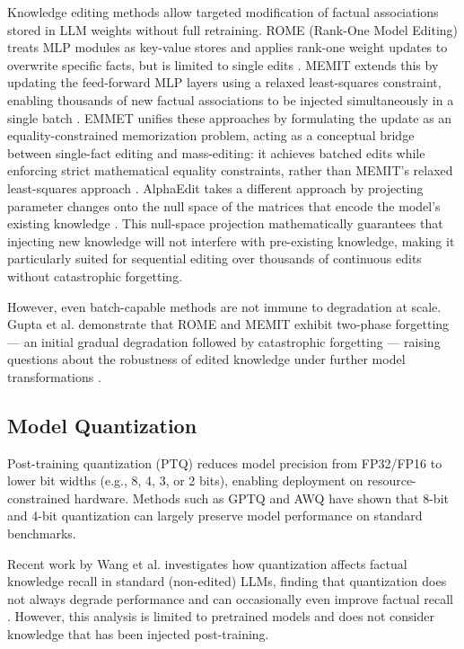 \documentclass[conference]{IEEEtran}
\begin{document}
Knowledge editing methods allow targeted modification of factual associations stored in LLM weights without full retraining. ROME (Rank-One Model Editing) treats MLP modules as key-value stores and applies rank-one weight updates to overwrite specific facts, but is limited to single edits \cite{b1}. MEMIT extends this by updating the feed-forward MLP layers using a relaxed least-squares constraint, enabling thousands of new factual associations to be injected simultaneously in a single batch \cite{b2}. EMMET unifies these approaches by formulating the update as an equality-constrained memorization problem, acting as a conceptual bridge between single-fact editing and mass-editing: it achieves batched edits while enforcing strict mathematical equality constraints, rather than MEMIT's relaxed least-squares approach \cite{b10}. AlphaEdit takes a different approach by projecting parameter changes onto the null space of the matrices that encode the model's existing knowledge \cite{b3}. This null-space projection mathematically guarantees that injecting new knowledge will not interfere with pre-existing knowledge, making it particularly suited for sequential editing over thousands of continuous edits without catastrophic forgetting.

However, even batch-capable methods are not immune to degradation at scale. Gupta et al. demonstrate that ROME and MEMIT exhibit two-phase forgetting --- an initial gradual degradation followed by catastrophic forgetting --- raising questions about the robustness of edited knowledge under further model transformations \cite{b4}.

\subsection{Model Quantization}

Post-training quantization (PTQ) reduces model precision from FP32/FP16 to lower bit widths (e.g., 8, 4, 3, or 2 bits), enabling deployment on resource-constrained hardware. Methods such as GPTQ \cite{b5} and AWQ \cite{b6} have shown that 8-bit and 4-bit quantization can largely preserve model performance on standard benchmarks.

Recent work by Wang et al. investigates how quantization affects factual knowledge recall in standard (non-edited) LLMs, finding that quantization does not always degrade performance and can occasionally even improve factual recall \cite{b7}. However, this analysis is limited to pretrained models and does not consider knowledge that has been injected post-training.
\end{document}
